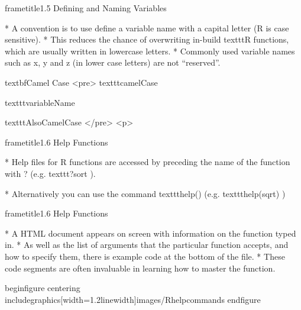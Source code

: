  	
 	
 		frametitle{1.5 Defining and Naming Variables}
 		
 			         * A convention is to use define a variable name with a capital letter (R is case sensitive). 
 			         * This
 			reduces the chance of overwriting in-build texttt{R} functions, which are usually written in lowercase
 			letters. 
 			         * Commonly used variable names such as x, y and z (in lower case letters) are not “reserved”.
 		
 		textbf{Camel Case}
 		<pre>
 			texttt{camelCase}
 			
 			texttt{variableName}
 			
 			texttt{AlsoCamelCase}
 		</pre>
<p>
 	

 	
 		
 		frametitle{1.6 Help Functions}
 		
 			          * Help files for R functions are accessed by preceding the name of the function with ?  (e.g. texttt{?sort}
 			). 
 			
 			         * Alternatively you can use the command texttt{help()} (e.g. texttt{help(sqrt)} )
 		
 		
 	
 	
 		
 		frametitle{1.6 Help Functions}
 		
 			         * A HTML document appears on screen with information on the function typed in. 
 			         * As well
 			as the list of arguments that the particular function accepts, and how to specify them, there is
 			example code at the bottom of the file. 
 			         * These code segments are often invaluable in learning
 			how to master the function.
 		
 		
 		
 	
 	
 	
 		begin{figure}
 			centering
 			includegraphics[width=1.2linewidth]{images/Rhelpcommands}
 		end{figure}
 	   
 	
 	
